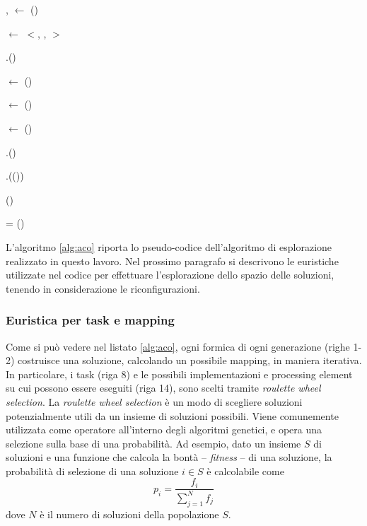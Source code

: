 \begin{algorithm}[!htbp]
{{{{				\ForAll{\Pi $\in$ \pSet}{
					\pIiPi $\leftarrow$ \mappingHeuristic(\Ii, \Pi)
				}
			}
			\chosenI, \chosenP $\leftarrow$ \rouletteSelection(\pIP)
			
			\chosenTrace $\leftarrow$ $<$\chosenT, \chosenI, \chosenP$>$
			
			\mappingTrace.\add(\chosenTrace)
			
			\readySet $\leftarrow$ \resolveDependencies()
		}

		\antMetrics $\leftarrow$ \computeMetrics(\antA)
		
		\antObjective $\leftarrow$ \computeObjective(\antMetrics)
		
		\thisGenerationSolutions.\add(\ant)
	}
	\bestAnts.\add(\selectBest(\thisGenerationSolutions))
	
	\updateGlobalPheromones(\bestAnts)
}

\bestAnt = \selectBestAnt(\bestAnts)
		
\Return \bestAntTrace

\caption{Pseudo-codice dell'algoritmo di esplorazione.}
\label{alg:aco}
\end{algorithm}

L'algoritmo \ref{alg:aco} riporta lo pseudo-codice dell'algoritmo di esplorazione
realizzato in questo lavoro.
Nel prossimo paragrafo si descrivono le euristiche utilizzate nel codice per effettuare
l'esplorazione dello spazio delle soluzioni, tenendo in considerazione le riconfigurazioni.


\subsubsection{Euristica per task e mapping}
Come si pu\`o vedere nel listato \ref{alg:aco}, ogni formica di ogni generazione (righe 1-2)
costruisce una soluzione, calcolando un possibile mapping, in maniera iterativa. In particolare,
i task (riga 8)  e le possibili implementazioni e processing element su cui possono essere eseguiti
(riga 14), sono scelti tramite \emph{roulette wheel selection}. La \emph{roulette wheel
selection} \`e un modo di scegliere soluzioni potenzialmente utili da un insieme di soluzioni possibili.
Viene comunemente utilizzata come operatore all'interno degli algoritmi genetici, e opera una selezione
sulla base di una probabilit\`a. Ad esempio, dato un insieme $S$ di soluzioni e una funzione che calcola
la bont\`a -- \emph{fitness} -- di una soluzione, la probabilit\`a di selezione di una soluzione
$i \in S$ \`e calcolabile come
\begin{displaymath}
  p_i = \frac{f_i}{\sum_{j=1}^{N}f_j}
\end{displaymath}
dove $N$ \`e il numero di soluzioni della popolazione $S$.

